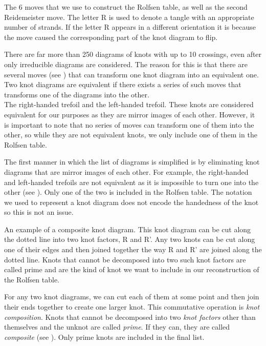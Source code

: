 \begin{paper}
{The 6 moves that we use to construct the Rolfsen table, as well as the second
Reidemeister move.
The letter R is used to denote a tangle with an appropriate number of strands.
If the letter R appears in a different orientation it is because the move caused
the corresponding part of the knot diagram to flip.}

There are far more than 250 diagrams of knots with up to 10 crossings, even
after only irreducible diagrams are considered.
The reason for this is that there are several moves (see \figMoves) that can
transform one knot diagram into an equivalent one.
Two knot diagrams are equivalent if there exists a series of such moves that
transforms one of the diagrams into the other.\\

{The right-handed trefoil and the left-handed trefoil.
These knots are considered equivalent for our purposes as they are mirror images
of each other.
However, it is important to note that no series of moves can transform one of
them into the other, so while they are not equivalent knots, we only include one
of them in the Rolfsen table.}

The first manner in which the list of diagrams is simplified is by eliminating
knot diagrams that are mirror images of each other.
For example, the right-handed and left-handed trefoils are not equivalent as it
is impossible to turn one into the other (see \figTrefoil).
Only one of the two is included in the Rolfsen table.
The notation we used to represent a knot diagram does not encode the handedness
of the knot so this is not an issue.

{An example of a composite knot diagram.
This knot diagram can be cut along the dotted line into two knot factors, R and
R'.
Any two knots can be cut along one of their edges and then joined together the
way R and R' are joined along the dotted line.
Knots that cannot be decomposed into two such knot factors are called prime and
are the kind of knot we want to include in our reconstruction of the Rolfsen
table.}

For any two knot diagrams, we can cut each of them at some point and then join
their ends together to create one larger knot.
This commutative operation is \textit{knot composition}.
Knots that cannot be decomposed into two \textit{knot factors} other than
themselves and the unknot are called \textit{prime}.
If they can, they are called \textit{composite} (see \figComposite).
Only prime knots are included in the final list.


\end{paper}
